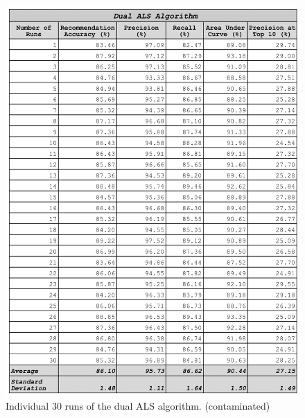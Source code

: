 \begin{figure}
\centering
\includegraphics[scale=0.3]{images/dual_als_30_runs.png}
\caption{Individual 30 runs of the dual ALS algorithm. (contaminated)}
\label{fig:dual_algorithm}
\end{figure}

